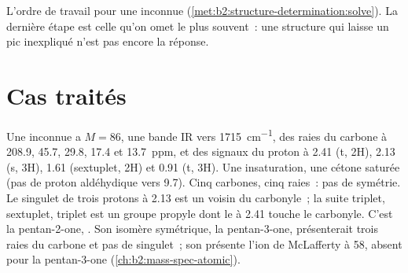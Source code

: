 \begin{omfigure}
\par\vspace{4pt}

{\small L'ordre de travail pour une inconnue (\cref{met:b2:structure-determination:solve}). La dernière
étape est celle qu'on omet le plus souvent~: une structure qui laisse un pic inexpliqué n'est pas encore
la réponse.}
\end{omfigure}

\section{Cas traités}

\begin{example}\label{ex:b2:structure-determination:ketone}
Une inconnue a $M = 86$, une bande IR vers \qty{1715}{cm^{-1}}, des raies du carbone à 208.9, 45.7, 29.8,
17.4 et
13.7~ppm, et des signaux du proton à 2.41 (t, 2H), 2.13 (s, 3H), 1.61 (sextuplet, 2H) et 0.91 (t, 3H).
Une insaturation, une cétone saturée (pas de proton aldéhydique vers 9.7). Cinq carbones, cinq raies~:
pas de symétrie. Le singulet de trois protons à 2.13 est un  voisin du carbonyle~; la suite
triplet, sextuplet, triplet est un groupe propyle dont le  à 2.41 touche le carbonyle. C'est la
pentan-2-one,
. Son isomère symétrique, la pentan-3-one, présenterait trois raies du carbone et pas
de singulet~; son  présente l'ion de McLafferty à 58, absent pour la pentan-3-one (\cref{ch:b2:mass-spec-atomic}).
\end{example}

